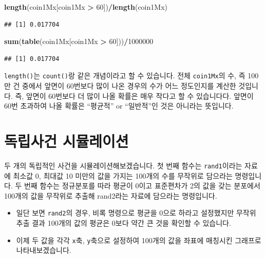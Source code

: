 \documentclass[]{book}
\newenvironment{Shaded}{\begin{snugshade}}{\end{snugshade}}
\newcommand{\DecValTok}[1]{\textcolor[rgb]{0.00,0.00,0.81}{#1}}
\newcommand{\KeywordTok}[1]{\textcolor[rgb]{0.13,0.29,0.53}{\textbf{#1}}}
\newcommand{\NormalTok}[1]{#1}
\newcommand{\OperatorTok}[1]{\textcolor[rgb]{0.81,0.36,0.00}{\textbf{#1}}}
\newcommand{\StringTok}[1]{\textcolor[rgb]{0.31,0.60,0.02}{#1}}
\providecommand{\tightlist}{%
  \setlength{\itemsep}{0pt}\setlength{\parskip}{0pt}}
\begin{document}
\begin{Shaded}
\begin{Highlighting}[]
\KeywordTok{length}\NormalTok{(coin1Mx[coin1Mx }\OperatorTok{>}\StringTok{ }\DecValTok{60}\NormalTok{])}\OperatorTok{/}\KeywordTok{length}\NormalTok{(coin1Mx)}
\end{Highlighting}
\end{Shaded}

\begin{verbatim}
## [1] 0.017704
\end{verbatim}

\begin{Shaded}
\begin{Highlighting}[]
\KeywordTok{sum}\NormalTok{(}\KeywordTok{table}\NormalTok{(coin1Mx[coin1Mx }\OperatorTok{>}\StringTok{ }\DecValTok{60}\NormalTok{]))}\OperatorTok{/}\DecValTok{1000000}
\end{Highlighting}
\end{Shaded}

\begin{verbatim}
## [1] 0.017704
\end{verbatim}

\texttt{length()}는 \texttt{count()}랑 같은 개념이라고 할 수 있습니다. 전체 \texttt{coin1Mx}의 수, 즉 100만 건 중에서 앞면이 60번보다 많이 나온 경우의 수가 어느 정도인지를 계산한 것입니다. 즉, 앞면이 60번보다 더 많이 나올 확률은 매우 작다고 할 수 있습니다다. 앞면이 60번 초과하여 나올 확률은 ``평균적'' or ``일반적''인 것은 아니라는 뜻입니다.

\hypertarget{uxb3c5uxb9bduxc0acuxac74-uxc2dcuxbbacuxb808uxc774uxc158}{%
\section{독립사건 시뮬레이션}\label{uxb3c5uxb9bduxc0acuxac74-uxc2dcuxbbacuxb808uxc774uxc158}}

두 개의 독립적인 사건을 시뮬레이션해보겠습니다. 첫 번째 함수는 \texttt{rand1}이라는 자료에 최소값 0, 최대값 10 미만의 값을 가지는 100개의 수를 무작위로 담으라는 명령입니다. 두 번째 함수는 정규분포를 따라 평균이 0이고 표준편차가 2의 값을 갖는 분포에서 100개의 값을 무작위로 추출해 rand2라는 자료에 담으라는 명령입니다.

\begin{itemize}
\tightlist
\item
  일단 보면 \texttt{rand2}의 경우, 비록 명령으로 평균을 0으로 하라고 설정했지만 무작위 추출 결과 100개의 값의 평균은 0보다 약간 큰 것을 확인할 수 있습니다.
\item
  이제 두 값을 각각 \texttt{x}축, \texttt{y}축으로 설정하여 100개의 값을 좌표에 매칭시킨 그래프로 나타내보겠습니다.
\end{itemize}
\end{document}
